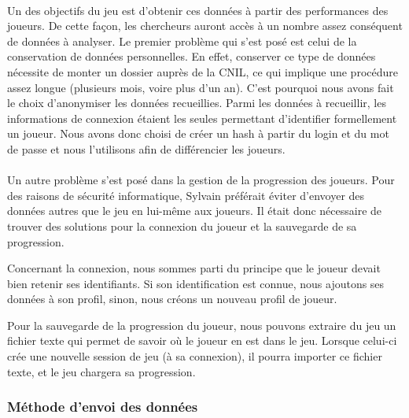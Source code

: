 \paragraph{}Un des objectifs du jeu est d'obtenir ces données à partir des performances des joueurs. De cette façon, les chercheurs auront accès à un nombre assez conséquent de
données à analyser. Le premier problème qui s'est posé est celui de la conservation de données personnelles. En effet, conserver ce type de données nécessite de monter un dossier
auprès de la \gls{CNIL}, ce qui implique une procédure assez longue (plusieurs mois, voire plus d'un an). C'est pourquoi nous avons fait le choix d'anonymiser les données recueillies.
Parmi les données à recueillir, les informations de connexion étaient les seules permettant d'identifier formellement un joueur. Nous avons donc choisi de créer un hash à partir du
login et du mot de passe et nous l'utilisons afin de différencier les joueurs.

\paragraph{}Un autre problème s'est posé dans la gestion de la progression des joueurs. Pour des raisons de sécurité informatique, Sylvain préférait éviter d'envoyer des données autres
que le jeu en lui-même aux joueurs. Il était donc nécessaire de trouver des solutions pour la connexion du joueur et la sauvegarde de sa progression.

Concernant la connexion, nous sommes
parti du principe que le joueur devait bien retenir ses identifiants. Si son identification est connue, nous ajoutons ses données à son profil, sinon, nous créons un nouveau profil
de joueur.

Pour la sauvegarde de la progression du joueur, nous pouvons extraire du jeu un fichier texte qui permet de savoir où le joueur en est dans le jeu. Lorsque celui-ci crée une
nouvelle session de jeu (à sa connexion), il pourra importer ce fichier texte, et le jeu chargera sa progression.

\subsubsection{Méthode d'envoi des données}

